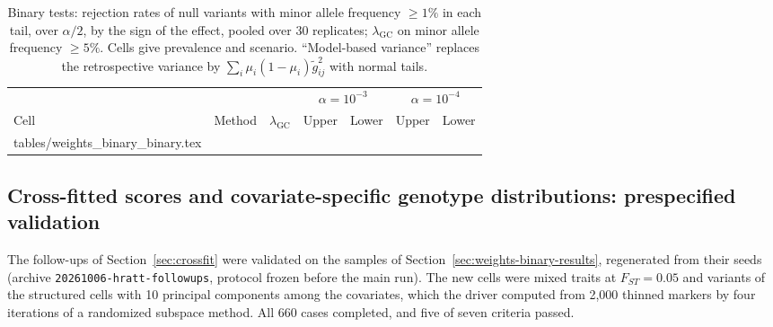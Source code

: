 \documentclass[11pt]{article}
\makeatletter
\newcommand{\lgc}{\lambda_{\mathrm{GC}}}
\newcommand{\code}[1]{\texttt{#1}}
\newcommand{\tabinput}[1]{\@@input #1 }
\makeatother
\begin{document}
\begin{table}[htbp]
 \centering\small
 \caption{Binary tests: rejection rates of null variants with minor allele
 frequency $\ge1\%$ in each tail, over $\alpha/2$, by the sign of the effect,
 pooled over 30 replicates; $\lgc$ on minor allele frequency $\ge5\%$.
 Cells give prevalence and scenario. ``Model-based variance'' replaces the
 retrospective variance by $\sum_i\mu_i(1-\mu_i)\tilde g_{ij}^2$ with normal
 tails.}
 \label{tab:weights-binary}
 \begin{tabular}{@{}llrrrrr@{}}
 \toprule
 & & & \multicolumn{2}{c}{$\alpha=10^{-3}$} & \multicolumn{2}{c}{$\alpha=10^{-4}$} \\
 Cell & Method & $\lgc$ & Upper & Lower & Upper & Lower \\
 \midrule
 \tabinput{tables/weights_binary_binary.tex}
 \bottomrule
 \end{tabular}
\end{table}

\FloatBarrier
\subsection{Cross-fitted scores and covariate-specific genotype distributions: prespecified validation}
\label{sec:followup-results}

The follow-ups of Section~\ref{sec:crossfit} were validated on the samples
of Section~\ref{sec:weights-binary-results}, regenerated from their seeds
(archive \code{20261006-}\allowbreak\code{hratt-followups}, protocol frozen
before the main run). The new cells were mixed traits at $F_{ST}=0.05$ and
variants of the structured cells with 10 principal components among the
covariates, which the driver computed from 2,000 thinned markers by four
iterations of a randomized subspace method. All 660 cases completed, and
five of seven criteria passed.
\end{document}
